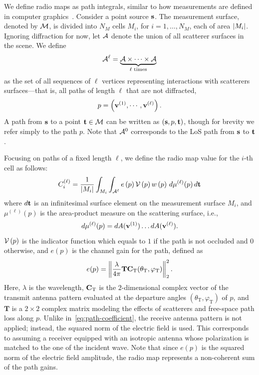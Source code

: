 We define radio maps as path integrals, similar to how measurements are defined in computer graphics~\cite[Section~3.7]{10.1145/15886.15902,
Veach:1997:RMC}.
Consider a point source $\mathbf{s}$. The measurement surface, denoted by ${\cal M}$, is divided into $N_M$ cells $M_i$, for $i = 1, \dots, N_M$, each of area $\left| M_i \right|$.
Ignoring diffraction for now, let ${\cal A}$ denote the union of all scatterer surfaces in the scene. We define
\begin{equation}
    {\cal A}^{\ell} = \underbrace{{\cal A} \times \cdots \times {\cal A}}_{\ell\text{ times}}
\end{equation}
as the set of all sequences of $\ell$ vertices representing interactions with scatterers surfaces—that is, all paths of length $\ell$ that are not diffracted,
\begin{equation}
    p = \left( \mathbf{v}^{(1)}, \cdots, \mathbf{v}^{(\ell)} \right).
\end{equation}
A path from $\mathbf{s}$ to a point $\mathbf{t} \in {\cal M}$ can be written as $\left( \mathbf{s}, p, \mathbf{t}\right)$, though for brevity we refer simply to the path $p$.
Note that ${\cal A}^{0}$ corresponds to the \gls{LoS} path from $\mathbf{s}$ to $\mathbf{t}$.

Focusing on paths of a fixed length $\ell$, we define the radio map value for the $i$-th cell as follows:
\begin{equation}
    \label{eq:radio-map-solver-ci-ell}
    C_i^{(\ell)} = \frac{1}{\left| M_i \right|} \int_{M_i} \int_{{\cal A}^{\ell}} e \left( p \right) {\cal V}\left( p \right) w \left( p \right)\, d\mu^{(\ell)}(p)\, d\mathbf{t}
\end{equation}
where $d\mathbf{t}$ is an infinitesimal surface element on the measurement surface $M_i$, and $\mu^{(\ell)}(p)$ is the area-product measure on the scattering surface, i.e.,
\begin{equation}
    d\mu^{(\ell)}(p) = dA(\mathbf{v}^{(1)}) \dots dA(\mathbf{v}^{(\ell)}).
\end{equation}
${\cal V}\left( p \right)$ is the indicator function which equals to $1$ if the path is not occluded and $0$ otherwise, and $e(p)$ is the channel gain for the path, defined as
\begin{equation}
    \label{eq:radio-map-solver-path-gain}
    e(p) = \left\lVert \frac{\lambda}{4\pi}  \mathbf{T} \mathbf{C}_\text{T}(\theta_\text{T}, \varphi_\text{T})  \right\rVert_2^2.
\end{equation}
Here, $\lambda$ is the wavelength, $\mathbf{C}_\text{T}$ is the $2$-dimensional complex vector of the transmit antenna pattern evaluated at the departure angles $(\theta_\text{T}, \varphi_\text{T})$ of $p$, and $\mathbf{T}$ is a $2 \times 2$ complex matrix modeling the effects of scatterers and free-space path loss along $p$. Unlike in~\eqref{eq:path-coefficient}, the receive antenna pattern is not applied; instead, the squared norm of the electric field is used. This corresponds to assuming a receiver equipped with an isotropic antenna whose polarization is matched to the one of the incident wave.
Note that since $e(p)$ is the squared norm of the electric field amplitude, the radio map represents a non-coherent sum of the path gains.

